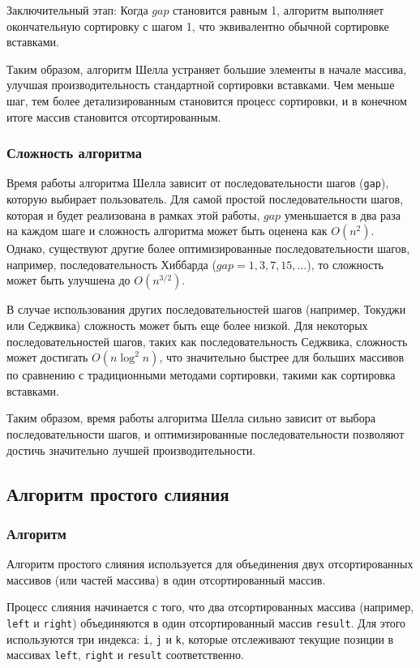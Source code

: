 \documentclass{report}
\begin{document}
Заключительный этап: Когда $gap$ становится равным 1, алгоритм выполняет окончательную сортировку с шагом 1, что эквивалентно обычной сортировке вставками.

Таким образом, алгоритм Шелла устраняет большие элементы в начале массива, улучшая производительность стандартной сортировки вставками. Чем меньше шаг, тем более детализированным становится процесс сортировки, и в конечном итоге массив становится отсортированным.

\subsubsection*{Сложность алгоритма}
Время работы алгоритма Шелла зависит от последовательности шагов (\texttt{gap}), которую выбирает пользователь. Для самой простой последовательности шагов, которая и будет реализована в рамках этой работы, $gap$ уменьшается в два раза на каждом шаге и сложность алгоритма может быть оценена как $O(n^2)$. Однако, существуют другие более оптимизированные последовательности шагов, например, последовательность Хиббарда ($gap = 1, 3, 7, 15, \dots$), то сложность может быть улучшена до $O(n^{3/2})$.

В случае использования других последовательностей шагов (например, Токуджи или Седжвика) сложность может быть еще более низкой. Для некоторых последовательностей шагов, таких как последовательность Седжвика, сложность может достигать $O(n \log^2 n)$, что значительно быстрее для больших массивов по сравнению с традиционными методами сортировки, такими как сортировка вставками.

Таким образом, время работы алгоритма Шелла сильно зависит от выбора последовательности шагов, и оптимизированные последовательности позволяют достичь значительно лучшей производительности.

\subsection*{Алгоритм простого слияния}

\subsubsection*{Алгоритм}
Алгоритм простого слияния используется для объединения двух отсортированных массивов (или частей массива) в один отсортированный массив.

Процесс слияния начинается с того, что два отсортированных массива (например, \texttt{left} и \texttt{right}) объединяются в один отсортированный массив \texttt{result}. Для этого используются три индекса: \texttt{i}, \texttt{j} и \texttt{k}, которые отслеживают текущие позиции в массивах \texttt{left}, \texttt{right} и \texttt{result} соответственно.
\end{document}
